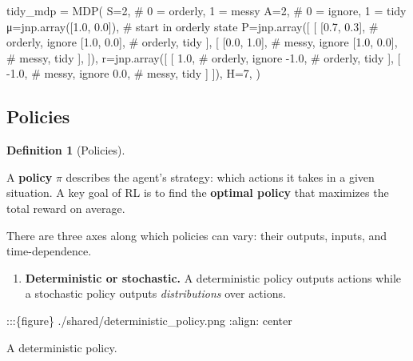 \documentclass[
  letterpaper,
  DIV=11,
  numbers=noendperiod]{scrreprt}
\newenvironment{Shaded}{\begin{snugshade}}{\end{snugshade}}
\newcommand{\CommentTok}[1]{\textcolor[rgb]{0.37,0.37,0.37}{#1}}
\newcommand{\DecValTok}[1]{\textcolor[rgb]{0.68,0.00,0.00}{#1}}
\newcommand{\FloatTok}[1]{\textcolor[rgb]{0.68,0.00,0.00}{#1}}
\newcommand{\NormalTok}[1]{\textcolor[rgb]{0.00,0.23,0.31}{#1}}
\newcommand{\OperatorTok}[1]{\textcolor[rgb]{0.37,0.37,0.37}{#1}}
\providecommand{\tightlist}{%
  \setlength{\itemsep}{0pt}\setlength{\parskip}{0pt}}\usepackage{longtable,booktabs,array}
\theoremstyle{plain}
\theoremstyle{plain}
\theoremstyle{definition}
\theoremstyle{definition}
\newtheorem{definition}{Definition}[chapter]
\theoremstyle{remark}
\begin{document}
\begin{Shaded}
\begin{Highlighting}[]
\NormalTok{tidy\_mdp }\OperatorTok{=}\NormalTok{ MDP(}
\NormalTok{    S}\OperatorTok{=}\DecValTok{2}\NormalTok{,  }\CommentTok{\# 0 = orderly, 1 = messy}
\NormalTok{    A}\OperatorTok{=}\DecValTok{2}\NormalTok{,  }\CommentTok{\# 0 = ignore, 1 = tidy}
\NormalTok{    μ}\OperatorTok{=}\NormalTok{jnp.array([}\FloatTok{1.0}\NormalTok{, }\FloatTok{0.0}\NormalTok{]),  }\CommentTok{\# start in orderly state}
\NormalTok{    P}\OperatorTok{=}\NormalTok{jnp.array([}
\NormalTok{        [}
\NormalTok{            [}\FloatTok{0.7}\NormalTok{, }\FloatTok{0.3}\NormalTok{],  }\CommentTok{\# orderly, ignore}
\NormalTok{            [}\FloatTok{1.0}\NormalTok{, }\FloatTok{0.0}\NormalTok{],  }\CommentTok{\# orderly, tidy}
\NormalTok{        ],}
\NormalTok{        [}
\NormalTok{            [}\FloatTok{0.0}\NormalTok{, }\FloatTok{1.0}\NormalTok{],  }\CommentTok{\# messy, ignore}
\NormalTok{            [}\FloatTok{1.0}\NormalTok{, }\FloatTok{0.0}\NormalTok{],  }\CommentTok{\# messy, tidy}
\NormalTok{        ],}
\NormalTok{    ]),}
\NormalTok{    r}\OperatorTok{=}\NormalTok{jnp.array([}
\NormalTok{        [}
            \FloatTok{1.0}\NormalTok{,   }\CommentTok{\# orderly, ignore}
            \OperatorTok{{-}}\FloatTok{1.0}\NormalTok{,  }\CommentTok{\# orderly, tidy}
\NormalTok{        ],}
\NormalTok{        [}
            \OperatorTok{{-}}\FloatTok{1.0}\NormalTok{,  }\CommentTok{\# messy, ignore}
            \FloatTok{0.0}\NormalTok{,   }\CommentTok{\# messy, tidy}
\NormalTok{        ]}
\NormalTok{    ]),}
\NormalTok{    H}\OperatorTok{=}\DecValTok{7}\NormalTok{,}
\NormalTok{)}
\end{Highlighting}
\end{Shaded}

\subsection{Policies}\label{policies}

\begin{definition}[Policies]\protect\hypertarget{def-policy}{}\label{def-policy}

A \textbf{policy} \(\pi\) describes the agent's strategy: which actions
it takes in a given situation. A key goal of RL is to find the
\textbf{optimal policy} that maximizes the total reward on average.

There are three axes along which policies can vary: their outputs,
inputs, and time-dependence.

\begin{enumerate}
\def\labelenumi{\arabic{enumi}.}
\tightlist
\item
  \textbf{Deterministic or stochastic.} A deterministic policy outputs
  actions while a stochastic policy outputs \emph{distributions} over
  actions.
\end{enumerate}

:::\{figure\} ./shared/deterministic\_policy.png :align: center

A deterministic policy.

\end{definition}
\end{document}
